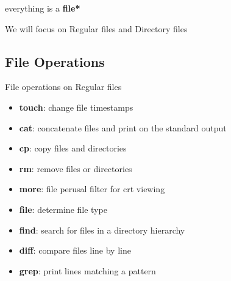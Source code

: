 \documentclass{beamer}
\begin{document}
    \begin{frame}{everything is a \textbf{file*}}
        \begin{center}
	    \huge{We will focus on Regular files and Directory files}
	    \end{center}
	\end{frame}
   

\subsection{File Operations}

\begin{frame}{File operations}{ on Regular files}


	\begin{itemize}
		\item {
				\textbf{touch}: change file timestamps
				\pause
				}
			\item {   
				\textbf{cat}: concatenate files and print on the standard output
				\pause
			}
		\item {
				\textbf{cp}: copy files and directories
				\pause
			}
	
		\item{
		        \textbf{rm}: remove files or directories
                \pause
		  }
		  
		  \item{
		        \textbf{more}: file perusal filter for crt viewing  
		        \pause
		  }
		  
		   \item{
		        \textbf{file}: determine file type
		        \pause
		  } 
		  
		  \item{
		        \textbf{find}: search for files in a directory hierarchy 
		        \pause
		  } 
		  
		  \item{
		        \textbf{diff}: compare files line by line 
	            \pause
		  } 
		  
		  \item{
		        \textbf{grep}: print lines matching a pattern  
		        \pause
		  }
		  
		  
	\end{itemize}
    \end{frame}
    
\end{document}
